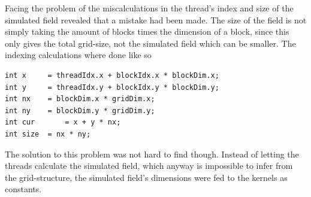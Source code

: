 
Facing the problem of the miscalculations in the thread's index and size of the simulated field revealed that a mistake had been made. The size of the field is not simply taking the amount of blocks times the dimension of a block, since this only gives the total grid-size, not the simulated field which can be smaller. The indexing calculations where done like so

\begin{verbatim}
int x     = threadIdx.x + blockIdx.x * blockDim.x;
int y     = threadIdx.y + blockIdx.y * blockDim.y;
int nx    = blockDim.x * gridDim.x;
int ny    = blockDim.y * gridDim.y;
int cur 	  = x + y * nx;
int size  = nx * ny;
\end{verbatim}

The solution to this problem was not hard to find though. Instead of letting the threads calculate the simulated field, which anyway is impossible to infer from the grid-structure, the simulated field's dimensions were fed to the kernels as constants.